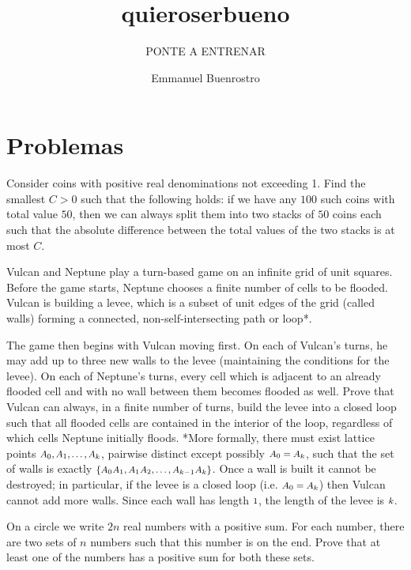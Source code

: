 \documentclass[11pt]{scrartcl}
\title{quieroserbueno}
\subtitle{PONTE A ENTRENAR}
\author{Emmanuel Buenrostro}
\begin{document}
\maketitle

\section{Problemas}
\begin{problem}[46260042068525]
Consider coins with positive real denominations not exceeding 1. Find the smallest $C>0$ such that the following holds: if we have any $100$ such coins with total value $50$, then we can always split them into two stacks of $50$ coins each such that the absolute difference between the total values of the two stacks is at most $C$.
\end{problem}
\begin{problem}[6064010778487493566]
Vulcan and Neptune play a turn-based game on an infinite grid of unit squares. Before the game starts, Neptune chooses a finite number of cells to be flooded. Vulcan is building a levee, which is a subset of unit edges of the grid (called walls) forming a connected, non-self-intersecting path or loop*.

The game then begins with Vulcan moving first. On each of Vulcan’s turns, he may add up to three new walls to the levee (maintaining the conditions for the levee). On each of Neptune’s turns, every cell which is adjacent to an already flooded cell and with no wall between them becomes flooded as well. Prove that Vulcan can always, in a finite number of turns, build the levee into a closed loop such that all flooded cells are contained in the interior of the loop, regardless of which cells Neptune initially floods.
*More formally, there must exist lattice points $\mbox{\footnotesize \(A_0, A_1, \dotsc, A_k\)}$, pairwise distinct except possibly $\mbox{\footnotesize \(A_0 = A_k\)}$, such that the set of walls is exactly $\mbox{\footnotesize \(\{A_0A_1, A_1A_2, \dotsc , A_{k-1}A_k\}\)}$. Once a wall is built it cannot be destroyed; in particular, if the levee is a closed loop (i.e. $\mbox{\footnotesize \(A_0 = A_k\)}$) then Vulcan cannot add more walls. Since each wall has length $\mbox{\footnotesize \(1\)}$, the length of the levee is $\mbox{\footnotesize \(k\)}$.
\end{problem}
\begin{problem}[1011347878697645666]
  On a circle we write $2n$ real numbers with a positive sum.
  For each number, there are two sets of $n$ numbers such that this number is on the end.
  Prove that at least one of the numbers has a positive sum for both these sets.
\end{problem}
\end{document}

